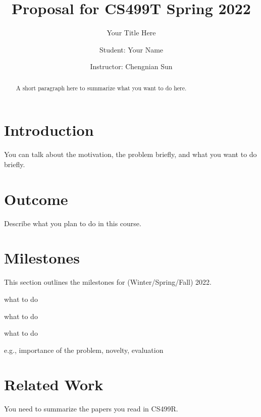 \documentclass[sigplan,screen]{acmart}
\begin{document}
\title{Proposal for CS499T Spring 2022}
\subtitle{Your Title Here}


\author{Student: Your Name}


\author{Instructor: Chengnian Sun}


\begin{abstract}
    A short paragraph here to summarize what you want to do here.
\end{abstract}


\maketitle



\section{Introduction}
You can talk about the motivation, the problem briefly,
and what you want to do briefly.


\section{Outcome}
Describe what you plan to do in this course.

\section{Milestones}
This section outlines the milestones for (Winter/Spring/Fall) 2022.

\begin{description}[leftmargin=0mm]
\item[Week 1] what to do
\item[Week 2] what to do
\item[Week ...] what to do
\end{description}

e.g., importance of the problem, novelty, evaluation

\section{Related Work}
You need to summarize the papers you read in CS499R.
\end{document}

